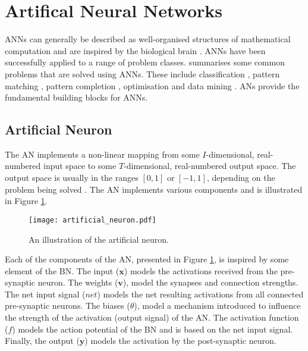\section{Artifical Neural Networks}
\label{sec:anns}

\acp{ANN} can generally be described as well-organised structures of mathematical computation and are inspired by the biological brain  \cite{ref:engelbrecht:2007}. \acp{ANN} have been successfully applied to a range of problem classes.  \citeauthor{ref:engelbrecht:2007}  \cite{ref:engelbrecht:2007} summarises some common problems that are solved using \acp{ANN}. These include classification  \cite{ref:khan:2001}, pattern matching  \cite{ref:cannady:1998, ref:kumar:1994}, pattern completion  \cite{ref:dayhoff:2001}, optimisation  \cite{ref:specht:1991} and data mining  \cite{ref:singh:2009}. \Acp{AN} provide the fundamental building blocks for \acp{ANN}.

\subsection{Artificial Neuron}
\label{sec:anns:an}

The \acs{AN} implements a non-linear mapping from some $I$-dimensional, real-numbered input space to some $T$-dimensional, real-numbered output space. The output space is usually in the ranges $[0,1]$ or $[-1,1]$, depending on the problem being solved \cite{ref:engelbrecht:2007}. The \acs{AN} implements various components and is illustrated in Figure  \ref{fig:artificial_neuron}.

\begin{figure}[htb]
	\centering
	\texttt{[image: artificial\_neuron.pdf]}
	\caption[The artificial neuron]{An illustration of the artificial neuron.}
	\label{fig:artificial_neuron}
\end{figure}

Each of the components of the \acs{AN}, presented in Figure  \ref{fig:artificial_neuron}, is inspired by some element of the \acs{BN}. The input ($\boldsymbol{x}$) models the activations received from the pre-synaptic neuron. The weights ($\boldsymbol{v}$), model the synapses and connection strengths. The net input signal ($net$) models the net resulting activations from all connected pre-synaptic neurons. The biases ($\theta$), model a mechanism introduced to influence the strength of the activation (output signal) of the \acs{AN}. The activation function ($f$) models the action potential of the \acs{BN} and is based on the net input signal. Finally, the output ($\boldsymbol{y}$) models the activation by the post-synaptic neuron.

